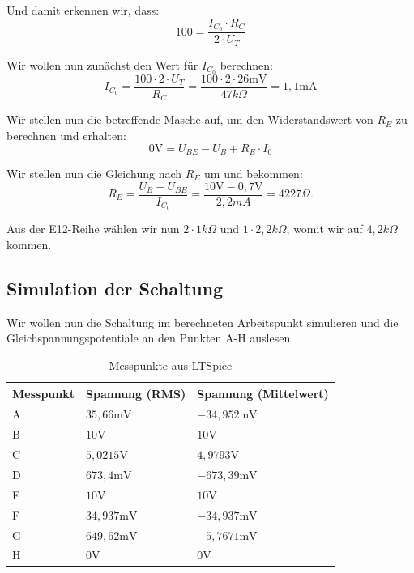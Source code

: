 \documentclass{article}
\begin{document}
Und damit erkennen wir, dass:
\begin{equation}
  \label{eq:2}
  100 = \frac{I_{C_{0}}\cdot R_{C}}{2\cdot U_{T}}
\end{equation}

Wir wollen nun zunächst den Wert für $I_{C_{0}}$ berechnen:
\begin{equation}
  \label{eq:3}
  I_{C_{0}} = \frac{100\cdot 2\cdot U_{T}}{R_{C}} = \frac{100 \cdot 2 \cdot 26\mathrm{mV}}{47k\Omega} = 1,1\mathrm{mA}
\end{equation}

Wir stellen nun die betreffende Masche auf, um den Widerstandswert von $R_{E}$ zu berechnen und erhalten:
\begin{equation}
  \label{eq:4}
  0\mathrm{V} = U_{BE} - U_{B} + R_{E}\cdot I_{0}
\end{equation}

Wir stellen nun die Gleichung nach $R_{E}$ um und bekommen:
\begin{equation}
  \label{eq:5}
  R_{E} = \frac{U_{B} - U_{BE}}{I_{C_{0}}} = \frac{10\mathrm{V}-0,7\mathrm{V}}{2,2mA} = 4227\Omega.
\end{equation}

Aus der E12-Reihe wählen wir nun $2\cdot 1k\Omega$ und $1\cdot 2,2k\Omega$, womit wir auf $4,2k\Omega$ kommen.

\subsection{Simulation der Schaltung}

Wir wollen nun die Schaltung im berechneten Arbeitspunkt simulieren und die Gleichspannungspotentiale an den Punkten A-H auslesen.
\begin{table}[h]
  \centering
  \begin{tabular}[h]{|l|l|l|}
    \hline
  Messpunkt & Spannung (RMS) & Spannung (Mittelwert)\\
    \hline
  A & $35,66\mathrm{mV}$ & $-34,952\mathrm{mV}$\\
    \hline
  B & $10\mathrm{V}$ & $10\mathrm{V}$\\
    \hline
  C & $5,0215\mathrm{V}$ & $4,9793\mathrm{V}$\\
    \hline
  D & $673,4\mathrm{mV}$ & $-673,39\mathrm{mV}$\\
    \hline
  E & $10\mathrm{V}$ & $10\mathrm{V}$\\
    \hline
  F & $34,937\mathrm{mV}$ & $-34,937\mathrm{mV}$\\
    \hline
  G & $649,62\mathrm{mV}$ & $-5,7671\mathrm{mV}$\\
    \hline
    H & $0\mathrm{V}$ & $0\mathrm{V}$\\
    \hline
  \end{tabular}
  \caption{Messpunkte aus LTSpice}
  \label{tab:table1}
\end{table}
\end{document}
